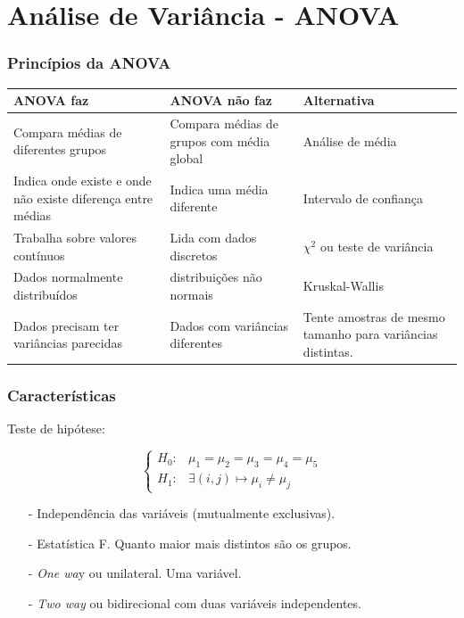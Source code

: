 \documentclass[graphics,14pt]{beamer}
\begin{document}
\section{Análise de Variância - ANOVA}
\begin{frame}[t,fragile=singleslide]
\frametitle{Princípios da ANOVA}
\begin{table}[]
	\centering
	\begin{tabularx}{30cm}{|C{9cm} | C{9cm} | C{9cm}|}
		\hline
		 ANOVA faz & ANOVA não faz & Alternativa \\ \hline
		Compara médias de diferentes grupos & Compara médias de grupos com média global & Análise de média \\ 		\hline
		Indica onde existe e onde não existe diferença entre médias & Indica uma média diferente &  Intervalo de confiança \\ \hline
		Trabalha sobre valores contínuos & Lida com dados discretos & $\chi^2$ ou teste de variância \\ \hline
		Dados normalmente distribuídos & distribuições não normais & Kruskal-Wallis \\ \hline
		Dados precisam ter variâncias parecidas & Dados com variâncias diferentes & Tente amostras de mesmo tamanho para variâncias distintas. \\ \hline
	\end{tabularx}
\end{table}
\end{frame}
\begin{frame}[t,fragile=singleslide]
\frametitle{Características}

Teste de hipótese:

\begin{equation*}
\left\{ \begin{array}{cl}
H_0: & \mu_1 = \mu_2 = \mu_3 = \mu_4 = \mu_5 \\
H_1: & \exists (i,j) \mapsto \mu_i \neq \mu_j
\end{array}\right.
\end{equation*}
\vspace{1cm}
\begin{itemize}
	\item[-] Independência das variáveis (mutualmente exclusivas).
	\item[-] Estatística F. Quanto maior mais distintos são os grupos.
	\item[-] \textit{One wa}y ou unilateral. Uma variável.
	\item[-] \textit{Two way} ou bidirecional com duas variáveis independentes.
\end{itemize}

\end{frame}
\end{document}
